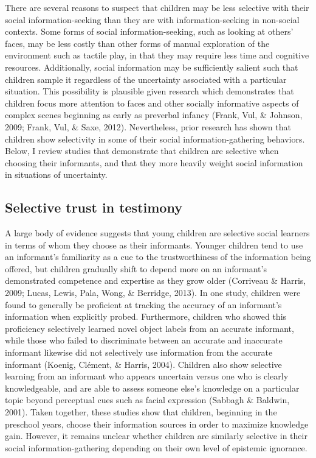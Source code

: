 \documentclass[floatsintext,man]{apa6}
\theoremstyle{definition}
\theoremstyle{definition}
\theoremstyle{definition}
\theoremstyle{remark}
\begin{document}
There are several reasons to suspect that children may be less selective
with their social information-seeking than they are with
information-seeking in non-social contexts. Some forms of social
information-seeking, such as looking at others' faces, may be less
costly than other forms of manual exploration of the environment such as
tactile play, in that they may require less time and cognitive
resources. Additionally, social information may be sufficiently salient
such that children sample it regardless of the uncertainty associated
with a particular situation. This possibility is plausible given
research which demonstrates that children focus more attention to faces
and other socially informative aspects of complex scenes beginning as
early as preverbal infancy (Frank, Vul, \& Johnson, 2009; Frank, Vul, \&
Saxe, 2012). Nevertheless, prior research has shown that children show
selectivity in some of their social information-gathering behaviors.
Below, I review studies that demonstrate that children are selective
when choosing their informants, and that they more heavily weight social
information in situations of uncertainty.

\subsection{Selective trust in
testimony}\label{selective-trust-in-testimony}

A large body of evidence suggests that young children are selective
social learners in terms of whom they choose as their informants.
Younger children tend to use an informant's familiarity as a cue to the
trustworthiness of the information being offered, but children gradually
shift to depend more on an informant's demonstrated competence and
expertise as they grow older (Corriveau \& Harris, 2009; Lucas, Lewis,
Pala, Wong, \& Berridge, 2013). In one study, children were found to
generally be proficient at tracking the accuracy of an informant's
information when explicitly probed. Furthermore, children who showed
this proficiency selectively learned novel object labels from an
accurate informant, while those who failed to discriminate between an
accurate and inaccurate informant likewise did not selectively use
information from the accurate informant (Koenig, Clément, \& Harris,
2004). Children also show selective learning from an informant who
appears uncertain versus one who is clearly knowledgeable, and are able
to assess someone else's knowledge on a particular topic beyond
perceptual cues such as facial expression (Sabbagh \& Baldwin, 2001).
Taken together, these studies show that children, beginning in the
preschool years, choose their information sources in order to maximize
knowledge gain. However, it remains unclear whether children are
similarly selective in their social information-gathering depending on
their own level of epistemic ignorance.
\end{document}
